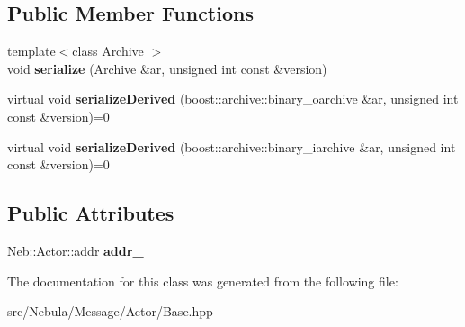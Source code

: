 \subsection*{\-Public \-Member \-Functions}
\begin{DoxyCompactItemize}
\item 
\hypertarget{classNeb_1_1Message_1_1Actor_1_1Base_a961a74203562be229bb3bd1a047dc6d2}{{\footnotesize template$<$class Archive $>$ }\\void {\bfseries serialize} (\-Archive \&ar, unsigned int const \&version)}\label{classNeb_1_1Message_1_1Actor_1_1Base_a961a74203562be229bb3bd1a047dc6d2}

\item 
\hypertarget{classNeb_1_1Message_1_1Actor_1_1Base_a81b750ebdc5e296d9ea892fe8e069934}{virtual void {\bfseries serialize\-Derived} (boost\-::archive\-::binary\-\_\-oarchive \&ar, unsigned int const \&version)=0}\label{classNeb_1_1Message_1_1Actor_1_1Base_a81b750ebdc5e296d9ea892fe8e069934}

\item 
\hypertarget{classNeb_1_1Message_1_1Actor_1_1Base_a32fc3888e2723e8babdb9d131bac7692}{virtual void {\bfseries serialize\-Derived} (boost\-::archive\-::binary\-\_\-iarchive \&ar, unsigned int const \&version)=0}\label{classNeb_1_1Message_1_1Actor_1_1Base_a32fc3888e2723e8babdb9d131bac7692}

\end{DoxyCompactItemize}
\subsection*{\-Public \-Attributes}
\begin{DoxyCompactItemize}
\item 
\hypertarget{classNeb_1_1Message_1_1Actor_1_1Base_ae59958d13992055e11bfc40d16a702cf}{\-Neb\-::\-Actor\-::addr {\bfseries addr\-\_\-}}\label{classNeb_1_1Message_1_1Actor_1_1Base_ae59958d13992055e11bfc40d16a702cf}

\end{DoxyCompactItemize}


\-The documentation for this class was generated from the following file\-:\begin{DoxyCompactItemize}
\item 
src/\-Nebula/\-Message/\-Actor/\-Base.\-hpp\end{DoxyCompactItemize}
